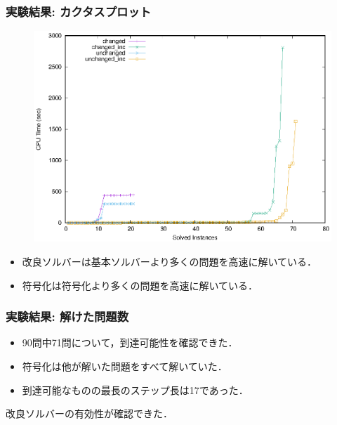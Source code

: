 \documentclass[dvipdfmx,11pt]{beamer}
\begin{document}
\begin{frame}\frametitle{実験結果: カクタスプロット}

  \begin{figure}[h]
    \centering
    \includegraphics[scale=0.6]{fig/cactus.eps}
  \end{figure}

  \begin{itemize}
    \item 改良ソルバーは基本ソルバーより多くの問題を高速に解いている．
    \item {}符号化は符号化より多くの問題を高速に解いている．
  \end{itemize}
  
\end{frame}


\begin{frame}\frametitle{実験結果: 解けた問題数}
    
  \begin{itemize}
    \item 90問中71問について，到達可能性を確認できた．
    \item {}符号化は他が解いた問題をすべて解いていた．
    \item 到達可能なものの最長のステップ長は17であった．
  \end{itemize}

  \begin{exampleblock}{}
    \centering
    \scalebox{0.8}{}
  \end{exampleblock}

  \begin{block}{}
    \centering
    改良ソルバーの有効性が確認できた．
  \end{block}
  
  \end{frame}
\end{document}
